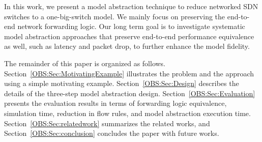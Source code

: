 In this work, we present a model abstraction technique to reduce networked SDN switches to a one-big-switch model.
We mainly focus on preserving the end-to-end network forwarding logic.
Our long term goal is to investigate systematic model abstraction approaches that preserve end-to-end performance equivalence as well,
such as latency and packet drop, to further enhance the model fidelity.

The remainder of this paper is organized as follows.
Section~\ref{OBS:Sec:MotivatingExample} illustrates the problem and the approach using a simple motivating example.
Section~\ref{OBS:Sec:Design} describes the details of the three-step model abstraction design.
Section~\ref{OBS:Sec:Evaluation} presents the evaluation results in terms of forwarding logic equivalence, simulation time,
reduction in flow rules, and model abstraction execution time.
Section~\ref{OBS:Sec:relatedwork} summarizes the related works, and Section~\ref{OBS:Sec:conclusion} concludes the paper with future works.
